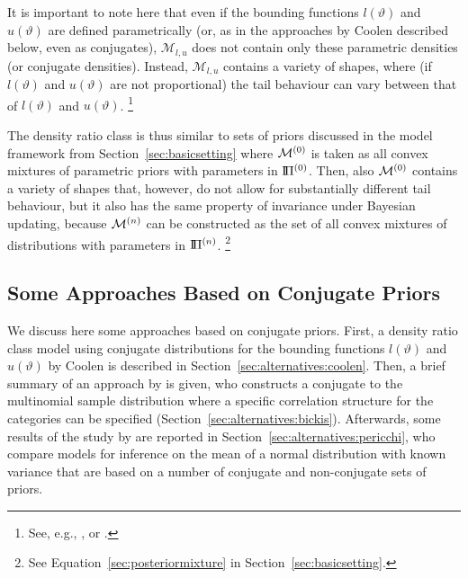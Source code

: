 It is important to note here that even if the bounding functions $l(\vartheta)$ and $u(\vartheta)$ are defined parametrically
(or, as in the approaches by Coolen \parencite*{1993:coolen, 1994:coolen} described below, even as conjugates),
$\mathcal{M}_{l,u}$ does not contain only these parametric densities (or conjugate densities).
Instead, $\mathcal{M}_{l,u}$ contains a variety of shapes, where
(if $l(\vartheta)$ and $u(\vartheta)$ are not proportional)
the tail behaviour can vary between that of $l(\vartheta)$ and $u(\vartheta)$.%
\footnote{See, e.g., \cite[\S 3.2]{2011:rinderknecht}, or \cite[\S 4.3]{1991:pericchi}.}

The density ratio class is thus similar to sets of priors
discussed in the model framework from Section~\ref{sec:basicsetting} where
$\mathcal{M}^{(0)}$ is taken as all convex mixtures of parametric priors with parameters in $\text{I}\!\Pi^{(0)}$.
Then, also $\mathcal{M}^{(0)}$ contains a variety of shapes that, however,
do not allow for substantially different tail behaviour,
but it also has the same property of invariance under Bayesian updating,
because $\mathcal{M}^{(n)}$ can be constructed as the set of all convex mixtures of distributions with parameters in $\text{I}\!\Pi^{(n)}$.%
\footnote{See Equation~\eqref{sec:posteriormixture} in Section~\ref{sec:basicsetting}.}


\subsection{Some Approaches Based on Conjugate Priors}
\label{sec:alternatives:conjugate}

We discuss here some approaches based on conjugate priors.
First, a density ratio class model using conjugate distributions
for the bounding functions $l(\vartheta)$ and $u(\vartheta)$
by Coolen \parencite*{1993:coolen,1994:coolen} is described in Section~\ref{sec:alternatives:coolen}.
Then, a brief summary of an approach by \textcite{2009:bickis} is given,
who constructs a conjugate to the multinomial sample distribution
where a specific correlation structure for the categories can be specified (Section~\ref{sec:alternatives:bickis}).
Afterwards, some results of the study by \textcite{1991:pericchi} are reported in Section~\ref{sec:alternatives:pericchi},
who compare models for inference on the mean of a normal distribution with known variance
that are based on a number of conjugate and non-conjugate sets of priors.
 

